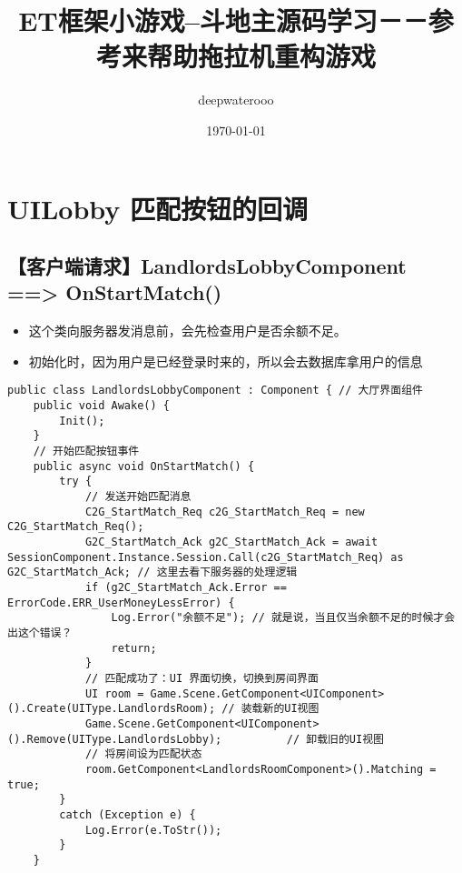 \documentclass[9pt, b5paper]{article}
\author{deepwaterooo}
\date{\today}
\title{ET框架小游戏--斗地主源码学习－－参考来帮助拖拉机重构游戏}
\begin{document}
\maketitle
\tableofcontents


\section{UILobby 匹配按钮的回调}
\label{sec-1}
\subsection{【客户端请求】LandlordsLobbyComponent ==> OnStartMatch()}
\label{sec-1-1}
\begin{itemize}
\item 这个类向服务器发消息前，会先检查用户是否余额不足。
\item 初始化时，因为用户是已经登录时来的，所以会去数据库拿用户的信息
\end{itemize}
\begin{verbatim}
public class LandlordsLobbyComponent : Component { // 大厅界面组件
    public void Awake() {
        Init();
    }
    // 开始匹配按钮事件
    public async void OnStartMatch() { 
        try {
            // 发送开始匹配消息
            C2G_StartMatch_Req c2G_StartMatch_Req = new C2G_StartMatch_Req();
            G2C_StartMatch_Ack g2C_StartMatch_Ack = await SessionComponent.Instance.Session.Call(c2G_StartMatch_Req) as G2C_StartMatch_Ack; // 这里去看下服务器的处理逻辑
            if (g2C_StartMatch_Ack.Error == ErrorCode.ERR_UserMoneyLessError) {
                Log.Error("余额不足"); // 就是说，当且仅当余额不足的时候才会出这个错误？
                return;
            }
            // 匹配成功了：UI 界面切换，切换到房间界面
            UI room = Game.Scene.GetComponent<UIComponent>().Create(UIType.LandlordsRoom); // 装载新的UI视图
            Game.Scene.GetComponent<UIComponent>().Remove(UIType.LandlordsLobby);          // 卸载旧的UI视图
            // 将房间设为匹配状态
            room.GetComponent<LandlordsRoomComponent>().Matching = true;
        }
        catch (Exception e) {
            Log.Error(e.ToStr());
        }
    }
\end{verbatim}
\end{document}

